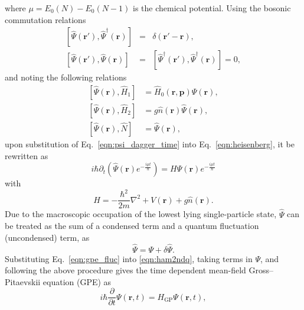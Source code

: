 where $\mu=E_0(N) - E_0(N-1)$ is the chemical potential. Using the bosonic commutation relations
\begin{eqnarray}
\left[\hat{\Psi}(\textbf{r}'), \hat{\Psi}^{\dagger}(\textbf{r})\right] &=& \delta(\textbf{r}' - \textbf{r}), \\
\left[\hat{\Psi}(\textbf{r}'), \hat{\Psi}(\textbf{r})\right] &=& \left[\hat{\Psi}^{\dagger}(\textbf{r}'), \hat{\Psi}^{\dagger}(\textbf{r})\right] = 0,
\end{eqnarray}
and noting the following relations
\begin{align}
\left[\hat{\Psi}(\textbf{r}),\hat{H}_1 \right] & = \hat{H}_0(\textbf{r},\textbf{p})\hat{\Psi}(\textbf{r}), \\
\left[\hat{\Psi}(\textbf{r}),\hat{H}_2 \right] & = g\hat{n}(\textbf{r})\hat{\Psi}(\textbf{r}), \\
\left[\hat{\Psi}(\textbf{r}),\hat{N} \right] & = \hat{\Psi}(\textbf{r}) ,
\end{align}
upon substitution of Eq.~\ref{eqn:psi_dagger_time} into Eq.~\ref{eqn:heisenberg}, it be rewritten as
\begin{equation}\label{eqn:almost_gpe}
    i \hbar \partial_t \left( \hat{\Psi}(\textbf{r}) e^{-\frac{i\mu t}{\hbar}} \right) = H \hat{\Psi}(\textbf{r}) e^{-\frac{i\mu t}{\hbar}}
\end{equation}
with
\begin{equation}\label{eqn:h_many}
H =  -\frac{\hbar^2}{2m}\nabla^2  + V(\textbf{r}) + g\hat{n}(\textbf{r}).
\end{equation}
Due to the macroscopic occupation of the lowest lying single-particle state, $\hat{\Psi}$ can be treated as the sum of a condensed term and a quantum fluctuation (uncondensed) term, as
\begin{equation}\label{eqn:gpe_fluc}
    \hat{\Psi} = \Psi + \delta\hat{\Psi}.
\end{equation}
Substituting Eq.~\ref{eqn:gpe_fluc} into \ref{eqn:ham2ndq}, taking terms in $\Psi$, and following the above procedure gives the time dependent mean-field Gross--Pitaevskii equation (GPE) as
\begin{equation}\label{eqn:gpe}
i\hbar\frac{\partial}{\partial t}\Psi(\textbf{r},t) = H_{\textrm{GP}} \Psi(\textbf{r},t),
\end{equation}
